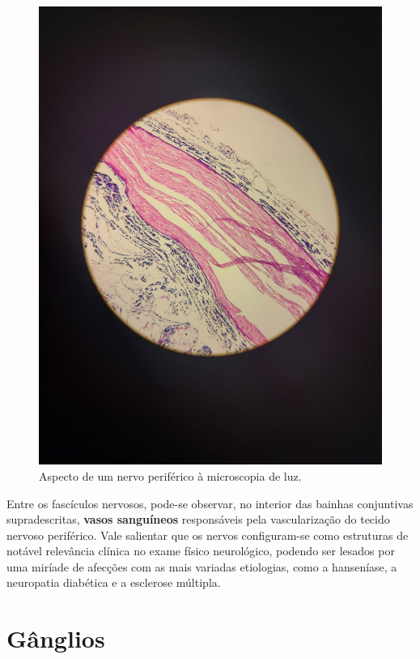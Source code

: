 \documentclass[
]{book}
\begin{document}
\begin{figure}
\centering
\includegraphics{images/neuro-nervo.jpeg}
\caption{\label{fig:unnamed-chunk-11}Aspecto de um nervo periférico à microscopia de luz.}
\end{figure}

Entre os fascículos nervosos, pode-se observar, no interior das bainhas conjuntivas supradescritas, \textbf{vasos sanguíneos} responsáveis pela vascularização do tecido nervoso periférico. Vale salientar que os nervos configuram-se como estruturas de notável relevância clínica no exame físico neurológico, podendo ser lesados por uma miríade de afecções com as mais variadas etiologias, como a hanseníase, a neuropatia diabética e a esclerose múltipla.

\hypertarget{guxe2nglios}{%
\chapter{Gânglios}\label{guxe2nglios}}
\end{document}
